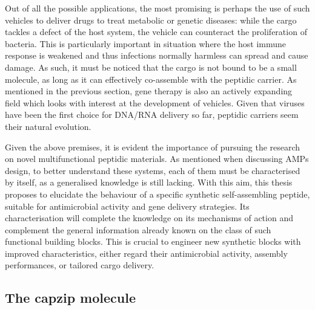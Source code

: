 Out of all the possible applications, the most promising is perhaps the use of such vehicles to deliver drugs to treat metabolic or genetic diseases: while the cargo tackles a defect of the host system, the vehicle can counteract the proliferation of bacteria. This is particularly important in situation where the host immune response is weakened and thus infections normally harmless can spread and cause damage.
%
As such, it must be noticed that the cargo is not bound to be a small molecule, as long as it can effectively co-assemble with the peptidic carrier. As mentioned in the previous section, gene therapy is also an actively expanding field which looks with interest at the development of vehicles. Given that viruses have been the first choice for DNA/RNA delivery so far, peptidic carriers seem their natural evolution.

Given the above premises, it is evident the importance of pursuing the research on novel multifunctional peptidic materials.
%
As mentioned when discussing AMPs design, to better understand these systems, each of them must be characterised by itself, as a generalised knowledge is still lacking.
With this aim, this thesis proposes to elucidate the behaviour of a specific synthetic self-assembling peptide, suitable for antimicrobial activity and gene delivery strategies.
%
Its characterisation will complete the knowledge on its mechanisms of action and complement the general information already known on the class of such functional building blocks. This is crucial to engineer new synthetic blocks with improved characteristics, either regard their antimicrobial activity, assembly performances, or tailored cargo delivery.


\subsection{The capzip molecule} \label{sec:capzip}

